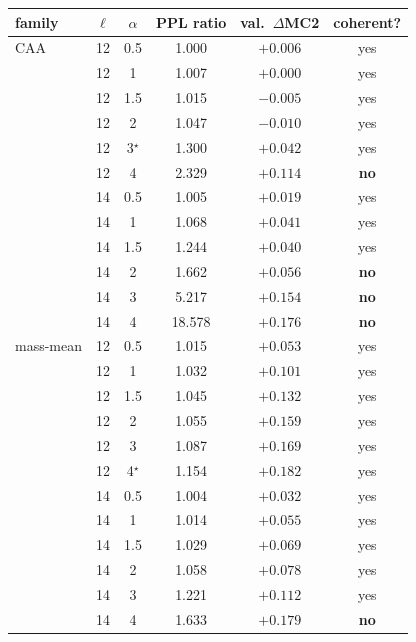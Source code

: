 \begin{tabular}{llcccc}
\toprule
family & $\ell$ & $\alpha$ & PPL ratio & val.\ $\Delta$MC2 & coherent? \\
\midrule
CAA & 12 & 0.5 & 1.000 & $+0.006$ & yes \\
 & 12 & 1 & 1.007 & $+0.000$ & yes \\
 & 12 & 1.5 & 1.015 & $-0.005$ & yes \\
 & 12 & 2 & 1.047 & $-0.010$ & yes \\
 & 12 & 3$^{\star}$ & 1.300 & $+0.042$ & yes \\
 & 12 & 4 & 2.329 & $+0.114$ & \textbf{no} \\
 & 14 & 0.5 & 1.005 & $+0.019$ & yes \\
 & 14 & 1 & 1.068 & $+0.041$ & yes \\
 & 14 & 1.5 & 1.244 & $+0.040$ & yes \\
 & 14 & 2 & 1.662 & $+0.056$ & \textbf{no} \\
 & 14 & 3 & 5.217 & $+0.154$ & \textbf{no} \\
 & 14 & 4 & 18.578 & $+0.176$ & \textbf{no} \\
\midrule
mass-mean & 12 & 0.5 & 1.015 & $+0.053$ & yes \\
 & 12 & 1 & 1.032 & $+0.101$ & yes \\
 & 12 & 1.5 & 1.045 & $+0.132$ & yes \\
 & 12 & 2 & 1.055 & $+0.159$ & yes \\
 & 12 & 3 & 1.087 & $+0.169$ & yes \\
 & 12 & 4$^{\star}$ & 1.154 & $+0.182$ & yes \\
 & 14 & 0.5 & 1.004 & $+0.032$ & yes \\
 & 14 & 1 & 1.014 & $+0.055$ & yes \\
 & 14 & 1.5 & 1.029 & $+0.069$ & yes \\
 & 14 & 2 & 1.058 & $+0.078$ & yes \\
 & 14 & 3 & 1.221 & $+0.112$ & yes \\
 & 14 & 4 & 1.633 & $+0.179$ & \textbf{no} \\
\bottomrule
\end{tabular}
